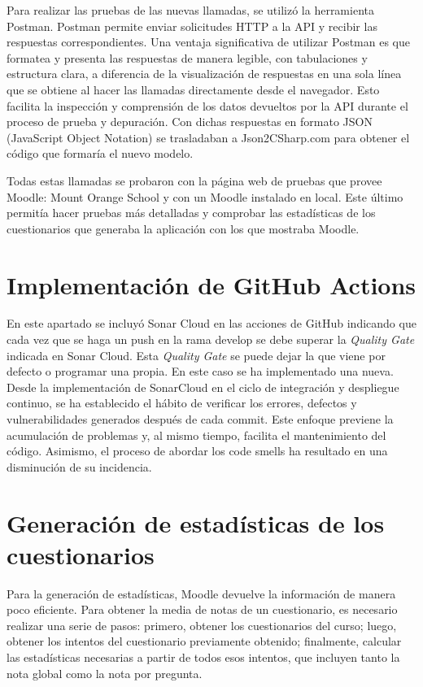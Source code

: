 Para realizar las pruebas de las nuevas llamadas, se utilizó la herramienta Postman. Postman permite enviar solicitudes HTTP a la API y recibir las respuestas correspondientes. Una ventaja significativa de utilizar Postman es que formatea y presenta las respuestas de manera legible, con tabulaciones y estructura clara, a diferencia de la visualización de respuestas en una sola línea que se obtiene al hacer las llamadas directamente desde el navegador. Esto facilita la inspección y comprensión de los datos devueltos por la API durante el proceso de prueba y depuración. Con dichas respuestas en formato JSON (JavaScript Object Notation) se trasladaban a Json2CSharp.com para obtener el código que formaría el nuevo modelo.

Todas estas llamadas se probaron con la página web de pruebas que provee Moodle: Mount Orange School y con un Moodle instalado en local. Este último permitía hacer pruebas más detalladas y comprobar las estadísticas de los cuestionarios que generaba la aplicación con los que mostraba Moodle.

\section{Implementación de GitHub Actions}
En este apartado se incluyó Sonar Cloud en las acciones de GitHub indicando que cada vez que se haga un push en la rama develop se debe superar la \textit{Quality Gate} indicada en Sonar Cloud. Esta \textit{Quality Gate} se puede dejar la que viene por defecto o programar una propia. En este caso se ha implementado una nueva. 
Desde la implementación de SonarCloud en el ciclo de integración y despliegue continuo, se ha establecido el hábito de verificar los errores, defectos y vulnerabilidades generados después de cada commit. Este enfoque previene la acumulación de problemas y, al mismo tiempo, facilita el mantenimiento del código. Asimismo, el proceso de abordar los code smells ha resultado en una disminución de su incidencia.

\section{Generación de estadísticas de los cuestionarios}
Para la generación de estadísticas, Moodle devuelve la información de manera poco eficiente. Para obtener la media de notas de un cuestionario, es necesario realizar una serie de pasos: primero, obtener los cuestionarios del curso; luego, obtener los intentos del cuestionario previamente obtenido; finalmente, calcular las estadísticas necesarias a partir de todos esos intentos, que incluyen tanto la nota global como la nota por pregunta.

